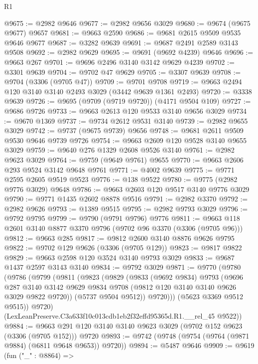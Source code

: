 \begin{lexlean}{R1}
\begin{coremodule}
@9675 := @2982 @9646
@9677 := @2982 @9656 @3029
@9680 := @9674 (@9675 @9677) @9657
@9681 := @9663 @2590
@9686 := @9681 @2615 @9509 @9535 @9646 @9677
@9687 := @3282 @9639
@9691 := @9687 @2491 @2589 @3143 @9508
@9692 := @2982 @9629
@9695 := @9691 (@9692 @4239) @9646
@9696 := @9663 @267
@9701 := @9696 @2496 @3140 @3142 @9629 @4239
@9702 := @3301 @9639
@9704 := @9702 @47 @9629
@9705 := @3307 @9639
@9708 := @9704 (@3306 (@9705 @47))
@9709 := @9701 @9708
@9719 := @9663 @2494 @120 @3140 @3140 @2493 @3029 (@3442 @9639 @1361 @2493)
@9720 := @3338 @9639
@9726 := @9695 (@9709 (@9719 @9720)) (@4171 @9504 @109)
@9727 := @9686 @9726
@9733 := @9663 @2613 @120 @9533 @3140 @9656 @3029
@9734 := @9670 @1369
@9737 := @9734 @2612 @9531 @3140
@9739 := @2982 @9655 @3029
@9742 := @9737 (@9675 @9739) @9656
@9748 := @9681 @2611 @9509 @9530 @9646 @9739 @9726
@9754 := @9663 @2609 @120 @9528 @3140 @9655 @3029
@9759 := @9640 @276 @1329 @2608 @9526 @3140
@9761 := @2982 @9623 @3029
@9764 := @9759 (@9649 @9761) @9655
@9770 := @9663 @2606 @293 @9524 @3142 @9648 @9761
@9771 := @4002 @9639
@9775 := @9771 @2595 @2605 @9519 @9523
@9776 := @138 @9522
@9780 := @9775 (@2982 @9776 @3029) @9648
@9786 := @9663 @2603 @120 @9517 @3140 @9776 @3029
@9790 := @9771 @1435 @2602 @8878 @9516
@9791 := @2982 @3370
@9792 := @2982 @9626
@9793 := @1389 @9515
@9795 := @2982 @9793 @3029
@9796 := @9792 @9795
@9799 := @9790 (@9791 @9796) @9776
@9811 := @9663 @118 @2601 @3140 @8877 @3370 @9796 (@9702 @96 @3370 (@3306 (@9705 @96)))
@9812 := @9663 @285
@9817 := @9812 @2600 @3140 @8876 @9626 @9795
@9822 := @9702 @129 @9626 (@3306 (@9705 @129))
@9823 := @9817 @9822
@9829 := @9663 @2598 @120 @3524 @3140 @9793 @3029
@9833 := @9687 @1437 @2597 @3143 @3140
@9834 := @9792 @3029
@9871 := @9770
    (@9780
      (@9786
        (@9799
          (@9811
            (@9823
              (@9829
                (@9833
                  (@9692 @9834)
                  @9793
                  (@9696
                    @287
                    @3140
                    @3142
                    @9629
                    @9834
                    @9708
                    (@9812 @120 @3140 @3140 @9626 @3029 @9822 @9720))
                  (@5737 @9504 @9512))
                @9720)))
          (@5623 @3369 @9512 @9515))
        @9720)
      (LexLeanPreserve.C3a633f10c013cdb1eb2f32effd95365d.R1.__rel_45 @9522))
@9884 := @9663 @291 @120 @3140 @3140 @9623 @3029 (@9702 @152 @9623 (@3306 (@9705 @152))) @9720
@9893 := @9742 (@9748 (@9754 (@9764 (@9871 @9884) (@6811 @9648 @9653)) @9720))
@9894 := @5487 @9646
@9909 := @9619
    (fun ("_" : @8864) =>

\end{coremodule}
\end{lexlean}
